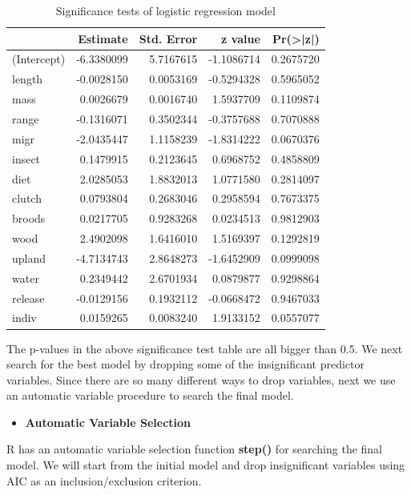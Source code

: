 \documentclass[
]{book}
\providecommand{\tightlist}{%
  \setlength{\itemsep}{0pt}\setlength{\parskip}{0pt}}
\begin{document}
\begin{table}

\caption{\label{tab:unnamed-chunk-101}Significance tests of logistic regression model}
\centering
\begin{tabular}[t]{l|r|r|r|r}
\hline
  & Estimate & Std. Error & z value & Pr(>|z|)\\
\hline
(Intercept) & -6.3380099 & 5.7167615 & -1.1086714 & 0.2675720\\
\hline
length & -0.0028150 & 0.0053169 & -0.5294328 & 0.5965052\\
\hline
mass & 0.0026679 & 0.0016740 & 1.5937709 & 0.1109874\\
\hline
range & -0.1316071 & 0.3502344 & -0.3757688 & 0.7070888\\
\hline
migr & -2.0435447 & 1.1158239 & -1.8314222 & 0.0670376\\
\hline
insect & 0.1479915 & 0.2123645 & 0.6968752 & 0.4858809\\
\hline
diet & 2.0285053 & 1.8832013 & 1.0771580 & 0.2814097\\
\hline
clutch & 0.0793804 & 0.2683046 & 0.2958594 & 0.7673375\\
\hline
broods & 0.0217705 & 0.9283268 & 0.0234513 & 0.9812903\\
\hline
wood & 2.4902098 & 1.6416010 & 1.5169397 & 0.1292819\\
\hline
upland & -4.7134743 & 2.8648273 & -1.6452909 & 0.0999098\\
\hline
water & 0.2349442 & 2.6701934 & 0.0879877 & 0.9298864\\
\hline
release & -0.0129156 & 0.1932112 & -0.0668472 & 0.9467033\\
\hline
indiv & 0.0159265 & 0.0083240 & 1.9133152 & 0.0557077\\
\hline
\end{tabular}
\end{table}

The p-values in the above significance test table are all bigger than 0.5. We next search for the best model by dropping some of the insignificant predictor variables. Since there are so many different ways to drop variables, next we use an automatic variable procedure to search the final model.

\begin{itemize}
\tightlist
\item
  \textbf{Automatic Variable Selection}
\end{itemize}

R has an automatic variable selection function \textbf{step()} for searching the final model. We will start from the initial model and drop insignificant variables using AIC as an inclusion/exclusion criterion.
\end{document}
